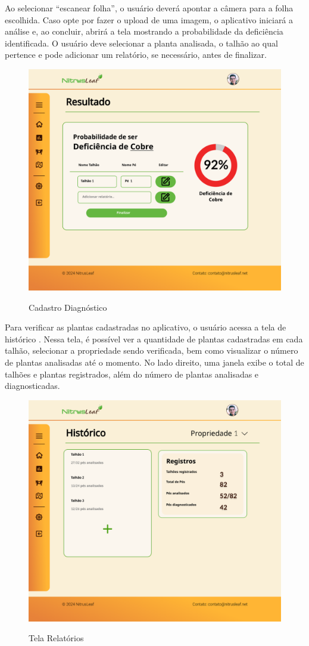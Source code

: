 Ao selecionar “escanear folha”, o usuário deverá apontar a câmera para a folha escolhida. Caso opte por fazer o upload de uma imagem, o aplicativo iniciará a análise e, ao concluir, abrirá a tela  mostrando a probabilidade da deficiência identificada. O usuário deve selecionar a planta analisada, o talhão ao qual pertence e pode adicionar um relatório, se necessário, antes de finalizar.

\begin{figure}[H]
\centering
\caption{Cadastro Diagnóstico}
\includegraphics[width=0.8\linewidth]{Illustrations/Tela-Escaneamentos.png}
\label{fig:cadastro-diagnóstico}
\end{figure}

Para verificar as plantas cadastradas no aplicativo, o usuário acessa a tela de histórico . Nessa tela, é possível ver a quantidade de plantas cadastradas em cada talhão, selecionar a propriedade sendo verificada, bem como visualizar o número de plantas analisadas até o momento. No lado direito, uma janela exibe o total de talhões e plantas registrados, além do número de plantas analisadas e diagnosticadas.

\begin{figure}[H]
\centering
\caption{Tela Relatórios}
\includegraphics[width=0.7\linewidth]{Illustrations/tela-historico.png}
\label{fig:tela-relatorios}
\end{figure}

